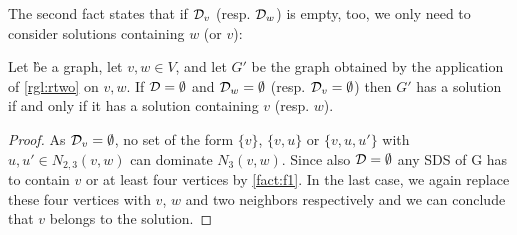 The second fact states that if  $\mathcal{D}_{v}$ (resp. $\mathcal{D}_{w}$) is empty, too, we only need to consider solutions containing $w$ (or $v$):

\begin{fact}\label{fact:f2}
    Let \G be a graph, let $v,w \in V$, and let $G'$ be the graph obtained by the application of \cref{rgl:rtwo} on $v, w$. If $\mathcal{D} = \emptyset$ and $\mathcal{D}_{w} = \emptyset$ (resp. $\mathcal{D}_{v} = \emptyset$) then $G'$ has a solution if and only if it has a solution containing $v$ (resp. $w$).
\end{fact}
\begin{proof}
As $\mathcal{D}_{v} = \emptyset$, no set of the form $\{v\}$, $\{v, u\}$ or $\{v, u, u'\}$ with $u, u' \in N_{2,3}(v,w)$ can dominate $N_3(v,w)$. Since also $\mathcal{D} = \emptyset$ any SDS of G has to contain $v$ or at least four vertices by \cref{fact:f1}. In the last case, we again replace these four vertices with $v$, $w$ and two neighbors respectively and we can conclude that $v$ belongs to the solution.
\end{proof}


